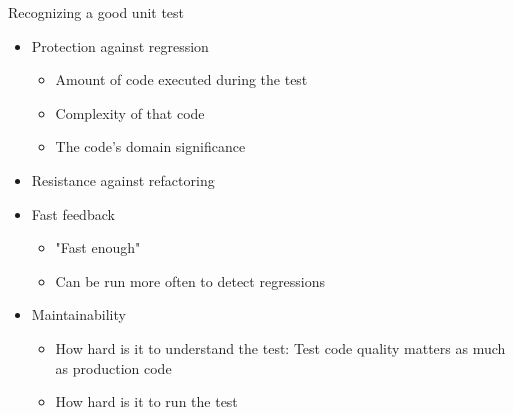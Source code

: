 \documentclass[english,handout,10pt,aspectratio=169,t]{beamer}
\begin{document}
\begin{frame}{Recognizing a good unit test}
  \begin{itemize}
    \item Protection against regression
    \begin{itemize}
      \item Amount of code executed during the test
      \item Complexity of that code
      \item The code's domain significance
    \end{itemize}
    \item Resistance against refactoring
    \item Fast feedback
    \begin{itemize}
      \item "Fast enough"
      \item Can be run more often to detect regressions
    \end{itemize}
    \item Maintainability
    \begin{itemize}
      \item How hard is it to understand the test: Test code quality matters as
      much as production code
      \item How hard is it to run the test
    \end{itemize}
  \end{itemize}
\end{frame}
\end{document}
